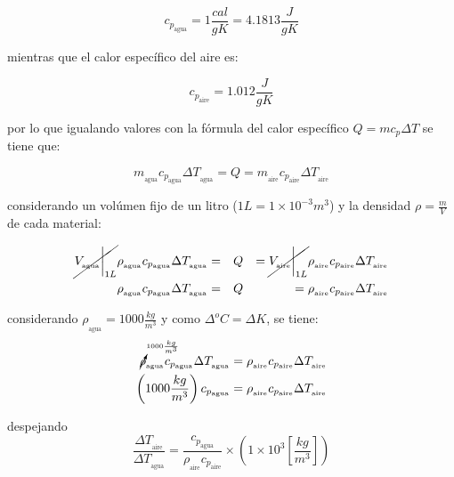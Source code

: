 \begin{equation}
\label{eqn:sh-water}
	c_{p_\text{agua}} = 1\frac{cal}{gK} = 4.1813\frac{J}{gK}
\end{equation}

\noindent mientras que el calor específico del aire es:

\begin{equation}
\label{eqn:sh-air}
	c_{p_\text{aire}} = 1.012\frac{J}{gK}
\end{equation}

\noindent por lo que igualando valores con la fórmula del calor específico $Q = mc_{p}\Delta T$ se tiene que:

\begin{equation*}
	m_{_\text{agua}}c_{p_\text{agua}}\Delta T_{_\text{agua}} = Q = m_{_\text{aire}}c_{p_\text{aire}}\Delta T_{_\text{aire}}
\end{equation*}

\noindent considerando un volúmen fijo de un litro ($1L=1\times10^{-3}m^{3}$) y la densidad $\rho=\frac{m}{V}$ de cada material:

\begin{align*}
	\cancel{V_{_\text{agua}}\bigg\rvert_{1L}}\rho_{_\text{agua}}c_{p_\text{agua}}\Delta T_{_\text{agua}}
	=&&Q&&=
	\cancel{V_{_\text{aire}}\bigg\rvert_{1L}}\rho_{_\text{aire}}c_{p_\text{aire}}\Delta T_{_\text{aire}}
	\\
	\rho_{_\text{agua}}c_{p_\text{agua}}\Delta T_{_\text{agua}}
	=&&Q&&=
	\rho_{_\text{aire}}c_{p_\text{aire}}\Delta T_{_\text{aire}}
\end{align*}

considerando $\rho_{_\text{agua}}=1000\frac{kg}{m^3}$ y como $\Delta^{o}C = \Delta K$, se tiene:
\begin{align*}
	\cancelto{\scriptscriptstyle 1000\frac{kg}{m^3}}{\rho}_{_\text{agua}}
	c_{p_\text{agua}}
	\Delta T_{_\text{agua}}
	&=
	\rho_{_\text{aire}}c_{p_\text{aire}}\Delta T_{_\text{aire}}
	\\
	\left(1000\frac{kg}{m^3}\right)c_{p_\text{agua}}
	&=
	\rho_{_\text{aire}}c_{p_\text{aire}}\Delta T_{_\text{aire}}
\end{align*}

\noindent despejando
\begin{equation}
\label{eqn:traise-equivalence}
	\frac{\Delta T_{_\text{aire}}}{\Delta T_{_\text{agua}}} =
	\frac{c_{p_\text{agua}}}{\rho_{_\text{aire}}c_{p_\text{aire}}}
	\times
	\left(1\times10^3\left[\frac{kg}{m^3}\right]\right)
\end{equation}

